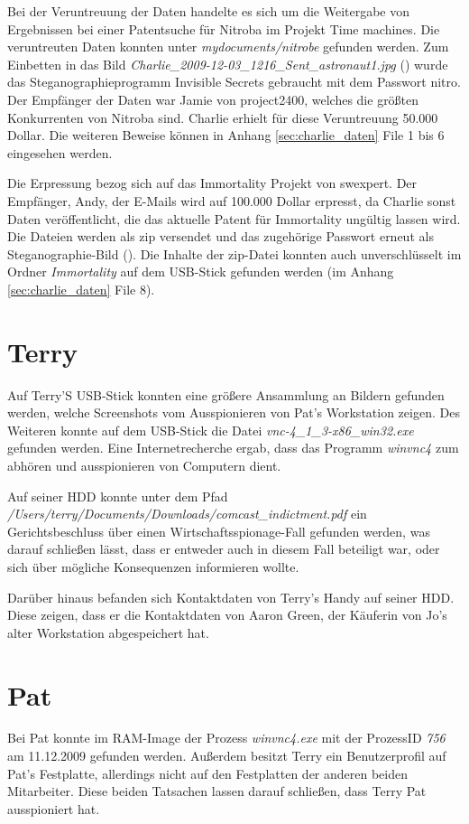 Bei der Veruntreuung der Daten handelte es sich um die Weitergabe von Ergebnissen bei einer Patentsuche für Nitroba im Projekt Time machines. Die veruntreuten Daten konnten unter \textit{mydocuments/nitrobe} gefunden werden. Zum Einbetten in das Bild \textit{Charlie_2009-12-03_1216_Sent_astronaut1.jpg} () wurde das Steganographieprogramm Invisible Secrets gebraucht mit dem Passwort nitro. Der Empfänger der Daten war Jamie von project2400, welches die größten Konkurrenten von Nitroba sind. Charlie erhielt für diese Veruntreuung 50.000 Dollar. Die weiteren Beweise können in Anhang \ref{sec:charlie_daten} File 1 bis 6 eingesehen werden.

Die Erpressung bezog sich auf das Immortality Projekt von swexpert. Der Empfänger, Andy, der E-Mails wird auf 100.000 Dollar erpresst, da Charlie sonst Daten veröffentlicht, die das aktuelle Patent für Immortality ungültig lassen wird. Die Dateien werden als zip versendet und das zugehörige Passwort erneut als Steganographie-Bild (). Die Inhalte der zip-Datei konnten auch unverschlüsselt im Ordner \textit{Immortality} auf dem USB-Stick gefunden werden (im Anhang \ref{sec:charlie_daten} File 8).

\section{Terry}
\label{sec:terry}
Auf Terry'S USB-Stick konnten eine größere Ansammlung an Bildern gefunden werden, welche Screenshots vom Ausspionieren von Pat's Workstation zeigen. Des Weiteren konnte auf dem USB-Stick die Datei \textit{vnc-4_1_3-x86_win32.exe} gefunden werden. Eine Internetrecherche ergab, dass das Programm \textit{winvnc4} zum abhören und ausspionieren von Computern dient.

Auf seiner HDD konnte unter dem Pfad \textit{/Users/terry/Documents/Downloads/comcast_indictment.pdf} ein Gerichtsbeschluss über einen Wirtschaftsspionage-Fall gefunden werden, was darauf schließen lässt, dass er entweder auch in diesem Fall beteiligt war, oder sich über mögliche Konsequenzen informieren wollte.\newline

Darüber hinaus befanden sich Kontaktdaten von Terry's Handy auf seiner HDD. Diese zeigen, dass er die Kontaktdaten von Aaron Green, der Käuferin von Jo's alter Workstation abgespeichert hat.

\section{Pat}
\label{sec:pat}
Bei Pat konnte im RAM-Image der Prozess \textit{winvnc4.exe} mit der ProzessID \textit{756} am 11.12.2009 gefunden werden. Außerdem besitzt Terry ein Benutzerprofil auf Pat's Festplatte, allerdings nicht auf den Festplatten der anderen beiden Mitarbeiter. Diese beiden Tatsachen lassen darauf schließen, dass Terry Pat ausspioniert hat.

